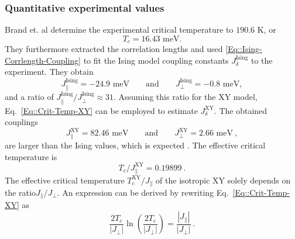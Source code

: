 	\subsubsection{Quantitative experimental values}
	Brand et. al determine the experimental critical temperature to $190.6 \text{ K}$, or  
	\begin{equation} \label{Eq::Exp-Tc}
		T_c =	16.43 \text{ meV.}
	\end{equation} 
	They furthermore extracted the correlation lengths and used \eqref{Eq::Ising-Corrlength-Coupling} to fit the Ising model coupling constants $J_\delta^{\text{Ising}}$ to the experiment. They obtain
	\begin{equation} \label{Eq::Exp-coupling-ising}
		J_\parallel^{\text{Ising}} =	-24.9 \text{ meV} 	\qquad \text{and} \qquad 	J_\perp^{\text{Ising}} =	-0.8 \text{ meV},
	\end{equation}
	and a ratio of $J_\parallel^{\text{Ising}} /	J_\perp^{\text{Ising}} \approx	31$.
	 Assuming this ratio for the XY model, Eq.~\eqref{Eq::Crit-Temp-XY} can be employed to estimate $J_\delta^{\text{XY}}$. The obtained couplings
	\begin{equation}
		J_\parallel^{\text{XY}} = 82.46 \text{ meV}\qquad \text{and} \qquad J_\perp^\text{XY} =	2.66 \text{ meV} ~,
	\end{equation}
	are larger than the Ising values, which is expected \cite{aizenman1980comparison}. %
	The effective critical temperature is
	\begin{equation} \label{Eq::Tc-XY-31}
		T_c /	J_\parallel^{\text{XY}} =	0.19899~.
	\end{equation}
	The effective critical temperature $T_c^{\text{XY}} /	J_\parallel$ of the isotropic XY solely depends on the ratio$J_\parallel /	J_\perp$. An expression can be derived by rewriting Eq.~\eqref{Eq::Crit-Temp-XY} as
	\begin{equation}
		\frac{2 T_c}{|J_\perp|} \ln \left(\frac{2 T_c}{ |J_\perp|}\right) =	\frac{|J_\parallel|}{|J_\perp|}~.
	\end{equation}
